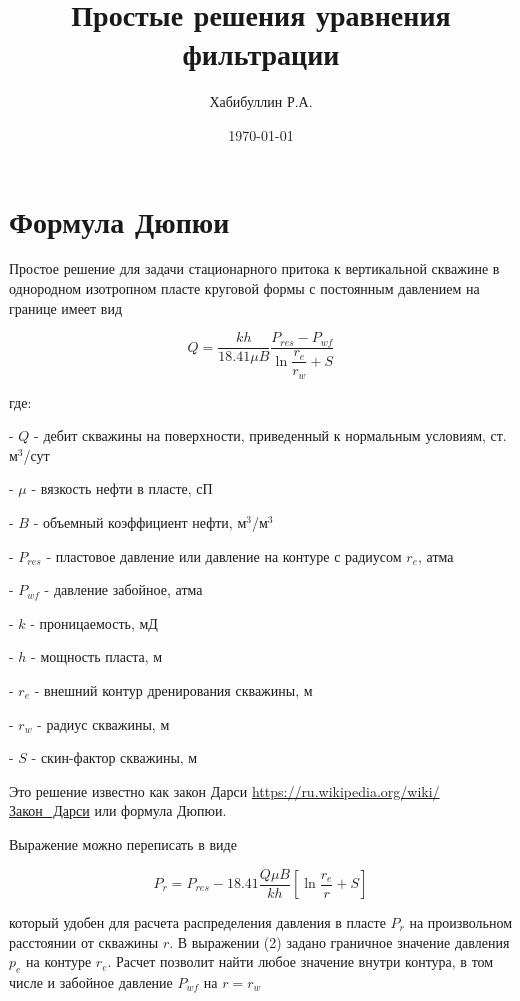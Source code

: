\documentclass[a4paper,12pt]{article}
\author{Хабибуллин Р.А.}
\title{Простые решения уравнения фильтрации}
\date{\today}
\begin{document}
	
	\maketitle
	
	\section{Формула Дюпюи}
	
	Простое решение для задачи стационарного притока к вертикальной скважине в однородном изотропном пласте круговой формы с постоянным давлением на границе имеет вид
	
	\begin{equation}
		Q=\dfrac{kh}{18.41\mu B} \dfrac{P_{res}-P_{wf}}{\ln \dfrac{r_e}{r_w} + S} 
	\end{equation}
	
	
	где: 
	
	- $Q$ - дебит скважины на поверхности, приведенный к нормальным условиям, ст. м$^3$/сут
	
	- $\mu$ - вязкость нефти в пласте, сП
	
	- $B$ - объемный коэффициент нефти, м$^3$/м$^3$
	
	- $P_{res}$ - пластовое давление или давление на контуре с радиусом $r_e$, атма
	
	- $P_{wf}$ - давление забойное, атма
	
	- $k$ - проницаемость, мД
	
	- $h$ - мощность пласта, м
	
	- $r_e$ - внешний контур дренирования скважины, м
	
	- $r_w$ - радиус скважины, м
	
	- $S$ - скин-фактор скважины, м
	
	Это решение известно как закон Дарси \url{https://ru.wikipedia.org/wiki/Закон_Дарси} или формула Дюпюи.
	
	Выражение можно переписать в виде
	
	\begin{equation}
		P_{r} = P_{res} - 18.41\dfrac{ Q\mu B }{kh} \left[ \ln\dfrac{r_e}{r} +S \right]
	\end{equation}
	
	который удобен для расчета распределения давления в пласте $P_r$ на произвольном расстоянии от скважины $r$.
	В выражении (2) задано граничное значение давления $p_e$ на контуре $r_e$. Расчет позволит найти любое значение внутри контура, в том числе и забойное давление $P_{wf}$ на $r=r_w$
	
\end{document}
